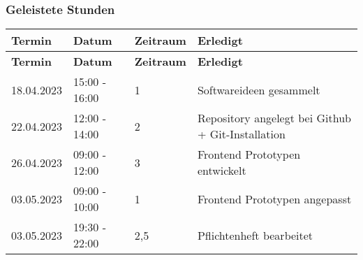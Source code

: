 \subsubsection{Geleistete Stunden}
\begin{flushleft}
		\begin{longtable}{p{2cm}p{}p{2cm}p{}}
            \toprule
            \textbf{Termin} & \textbf{Datum} & \textbf{Zeitraum} & \textbf{Erledigt}\\
            \midrule\endfirsthead
            \toprule
            \textbf{Termin} & \textbf{Datum} & \textbf{Zeitraum} & \textbf{Erledigt}\\
            \midrule\endhead
    		18.04.2023 & 15:00 - 16:00 & 1 & Softwareideen gesammelt\\ \midrule
    		22.04.2023 & 12:00 - 14:00 & 2 & Repository angelegt bei Github + Git-Installation\\ \midrule
    		26.04.2023 & 09:00 - 12:00 & 3 & Frontend Prototypen entwickelt\\ \midrule
    		03.05.2023 & 09:00 - 10:00 & 1 & Frontend Prototypen angepasst\\ \midrule
    		03.05.2023 & 19:30 - 22:00 & 2,5 & Pflichtenheft bearbeitet\\
            \bottomrule
    \end{longtable}
\end{flushleft}